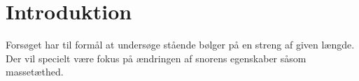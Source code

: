 \documentclass[A2_main.tex]{subfiles}
\begin{document}
\section{Introduktion}
Forsøget har til formål at undersøge stående bølger på en streng af given længde. Der vil specielt være fokus på ændringen af snorens egenskaber såsom massetæthed.
\end{document}
